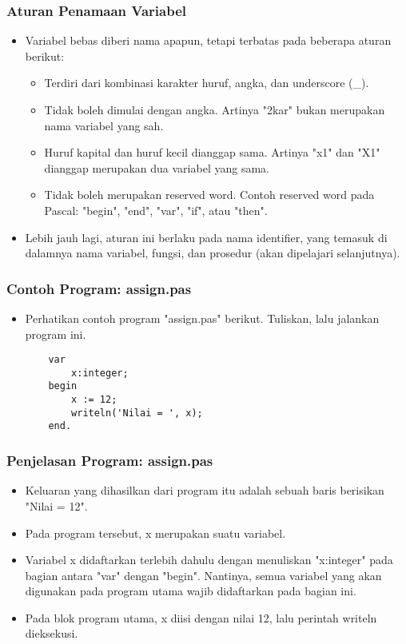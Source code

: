 \documentclass{beamer}
\begin{document}
\begin{frame}
\frametitle{Aturan Penamaan Variabel}
\begin{itemize}
	\item Variabel bebas diberi nama apapun, tetapi terbatas pada beberapa aturan berikut:
	\begin{itemize}
		\item Terdiri dari kombinasi karakter huruf, angka, dan underscore (\_).
		\item Tidak boleh dimulai dengan angka. Artinya "2kar" bukan merupakan nama variabel yang sah.
		\item Huruf kapital dan huruf kecil dianggap sama. Artinya "x1" dan "X1" dianggap merupakan dua variabel yang sama.
		\item Tidak boleh merupakan \alert{reserved word}. Contoh reserved word pada Pascal: "begin", "end", "var", "if", atau "then".
	\end{itemize}
	\item Lebih jauh lagi, aturan ini berlaku pada nama \alert{identifier}, yang temasuk di dalamnya nama variabel, fungsi, dan prosedur (akan dipelajari selanjutnya).
\end{itemize}
\end{frame}

\begin{frame}[fragile]
\frametitle{Contoh Program: assign.pas}
\begin{itemize}
	\item Perhatikan contoh program "assign.pas" berikut. Tuliskan, lalu jalankan program ini.
	\begin{lstlisting}
	var
	    x:integer;
	begin
	    x := 12;
	    writeln('Nilai = ', x);
	end.
	\end{lstlisting}
\end{itemize}
\end{frame}

\begin{frame}[fragile]
\frametitle{Penjelasan Program: assign.pas}
\begin{itemize}
	\item Keluaran yang dihasilkan dari program itu adalah sebuah baris berisikan "Nilai = 12".
	\item Pada program tersebut, x merupakan suatu variabel.
	\item Variabel x didaftarkan terlebih dahulu dengan menuliskan "x:integer" pada bagian antara "var" dengan "begin". Nantinya, semua variabel yang akan digunakan pada program utama wajib didaftarkan pada bagian ini.
	\item Pada blok program utama, x diisi dengan nilai 12, lalu perintah writeln dieksekusi.
\end{itemize}
\end{frame}
\end{document}
